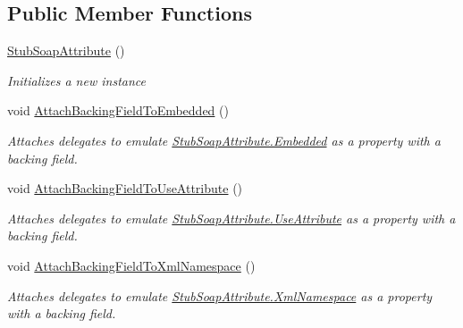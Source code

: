 \subsection*{Public Member Functions}
\begin{DoxyCompactItemize}
\item 
\hyperlink{class_system_1_1_runtime_1_1_remoting_1_1_metadata_1_1_fakes_1_1_stub_soap_attribute_ac3bbbe30ded8966e36c6a52d50c496ba}{Stub\-Soap\-Attribute} ()
\begin{DoxyCompactList}\small\item\em Initializes a new instance\end{DoxyCompactList}\item 
void \hyperlink{class_system_1_1_runtime_1_1_remoting_1_1_metadata_1_1_fakes_1_1_stub_soap_attribute_acf011afbff122d22c913f4c6c93e0cb4}{Attach\-Backing\-Field\-To\-Embedded} ()
\begin{DoxyCompactList}\small\item\em Attaches delegates to emulate \hyperlink{class_system_1_1_runtime_1_1_remoting_1_1_metadata_1_1_fakes_1_1_stub_soap_attribute_ac1ad6efb0bf0afc5165a3341b8d89709}{Stub\-Soap\-Attribute.\-Embedded} as a property with a backing field.\end{DoxyCompactList}\item 
void \hyperlink{class_system_1_1_runtime_1_1_remoting_1_1_metadata_1_1_fakes_1_1_stub_soap_attribute_ae54c391d136343b9c84da2ffead3f848}{Attach\-Backing\-Field\-To\-Use\-Attribute} ()
\begin{DoxyCompactList}\small\item\em Attaches delegates to emulate \hyperlink{class_system_1_1_runtime_1_1_remoting_1_1_metadata_1_1_fakes_1_1_stub_soap_attribute_a33c7b5037904fac7221b127434959a8d}{Stub\-Soap\-Attribute.\-Use\-Attribute} as a property with a backing field.\end{DoxyCompactList}\item 
void \hyperlink{class_system_1_1_runtime_1_1_remoting_1_1_metadata_1_1_fakes_1_1_stub_soap_attribute_ac14a966dc468efa1db314895d8558347}{Attach\-Backing\-Field\-To\-Xml\-Namespace} ()
\begin{DoxyCompactList}\small\item\em Attaches delegates to emulate \hyperlink{class_system_1_1_runtime_1_1_remoting_1_1_metadata_1_1_fakes_1_1_stub_soap_attribute_a0a0770d05f9004830da2f28b41ce2d1a}{Stub\-Soap\-Attribute.\-Xml\-Namespace} as a property with a backing field.\end{DoxyCompactList}\item 

\end{DoxyCompactItemize}
